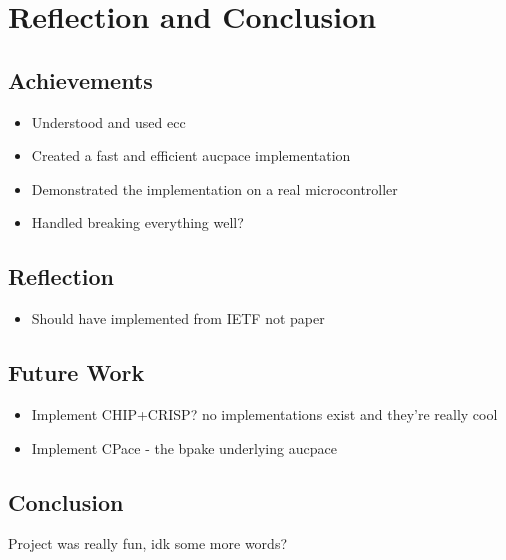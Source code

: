 \chapter{Reflection and Conclusion}
\label{chap:conclusion}

\section{Achievements}
\begin{itemize}
  \item{Understood and used \gls{ecc}}
  \item{Created a fast and efficient \gls{aucpace} implementation}
  \item{Demonstrated the implementation on a real microcontroller}
  \item{Handled breaking everything well?}
\end{itemize}

\section{Reflection}
\begin{itemize}
  \item{Should have implemented from IETF not paper}
\end{itemize}

\section{Future Work}
\begin{itemize}
  \item{Implement CHIP+CRISP? no implementations exist and they're really cool}
  \item{Implement CPace - the \gls{bpake} underlying \gls{aucpace}}
\end{itemize}

\section{Conclusion}
Project was really fun, idk some more words?

